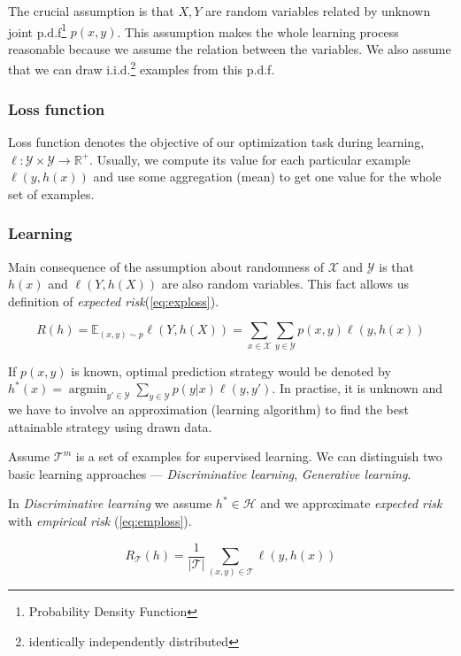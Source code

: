 The crucial assumption is that $X, Y$ are random variables related by unknown joint p.d.f\footnote{Probability Density Function} $p(x,y)$. This assumption makes the whole learning process reasonable because we assume the relation between the variables. We also assume that we can draw i.i.d.\footnote{identically independently distributed} examples from this p.d.f.

\subsubsection*{Loss function}
Loss function denotes the objective of our optimization task during learning, $\ell: \mathcal{Y} \times \mathcal{Y} \rightarrow \mathbb{R}^{+}$. Usually, we compute its value for each particular example $\ell(y, h(x))$ and use some aggregation (mean) to get one value for the whole set of examples.

\subsubsection*{Learning}
Main consequence of the assumption about randomness of $\mathcal{X}$ and $\mathcal{Y}$ is that $h(x)$ and $\ell(Y,h(X))$ are also random variables. This fact allows us definition of \emph{expected risk}(\ref{eq:exploss}).

\begin{equation} \label{eq:exploss}
    R(h)=\mathbb{E}_{(x,y) \sim p}\ell(Y,h(X))=\sum_{x \in \mathcal{X}}\sum_{y \in \mathcal{Y}}p(x,y)\ell(y,h(x))
\end{equation}

If $p(x,y)$ is known, optimal prediction strategy would be denoted by $h^*(x)=\operatorname*{argmin}_{{y}'\in \mathcal{Y}}\sum_{y\in\mathcal{Y}}p(y|x)\ell(y,{y}')$. In practise, it is unknown and we have to involve an approximation (learning algorithm) to find the best attainable strategy using drawn data.

Assume $\mathcal{T}^m$ is a set of examples for supervised learning. We can distinguish two basic learning approaches --- \emph{Discriminative learning}, \emph{Generative learning}.

In \emph{Discriminative learning} we assume $h^* \in \mathcal{H}$ and we approximate \emph{expected risk} with \emph{empirical risk} (\ref{eq:emploss}).

\begin{equation} \label{eq:emploss}
    R_{\mathcal{T}}(h)= \frac{1}{|\mathcal{T}|} \sum_{(x,y) \in \mathcal
    T}\ell(y,h(x))
\end{equation}

